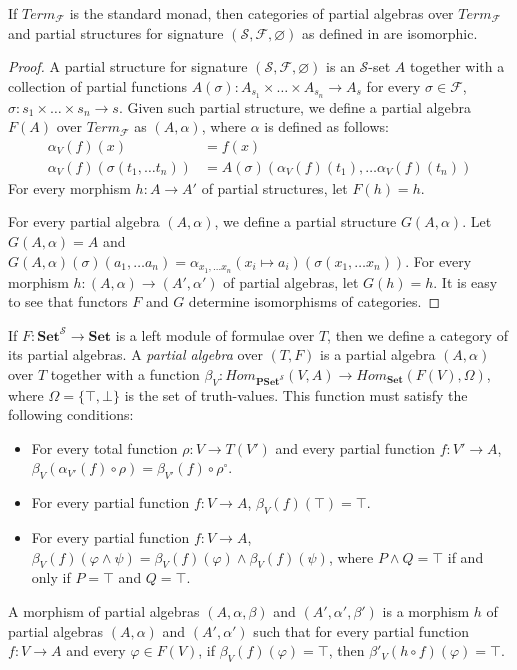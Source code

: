 \documentclass[reqno]{amsart}
\theoremstyle{definition}
\theoremstyle{remark}
\newcommand{\cat}[1]{\mathbf{#1}}
\newcommand{\Set}{\cat{Set}}
\newcommand{\PSet}{\cat{PSet}}
\numberwithin{figure}{section}
\begin{document}
\begin{lem}
If $Term_\mathcal{F}$ is the standard monad, then categories of partial algebras over $Term_\mathcal{F}$
    and partial structures for signature $(\mathcal{S},\mathcal{F},\varnothing)$ as defined in \cite{PHL} are isomorphic.
\end{lem}
\begin{proof}
A partial structure for signature $(\mathcal{S},\mathcal{F},\varnothing)$ is an $\mathcal{S}$-set $A$ together with a collection of partial functions
    $A(\sigma) : A_{s_1} \times \ldots \times A_{s_n} \to A_s$ for every $\sigma \in \mathcal{F}$, $\sigma : s_1 \times \ldots \times s_n \to s$.
Given such partial structure, we define a partial algebra $F(A)$ over $Term_\mathcal{F}$ as $(A,\alpha)$, where $\alpha$ is defined as follows:
\begin{align*}
\alpha_V(f)(x) & = f(x) \\
\alpha_V(f)(\sigma(t_1, \ldots t_n)) & = A(\sigma)(\alpha_V(f)(t_1), \ldots \alpha_V(f)(t_n))
\end{align*}
For every morphism $h : A \to A'$ of partial structures, let $F(h) = h$.

For every partial algebra $(A,\alpha)$, we define a partial structure $G(A,\alpha)$.
Let $G(A,\alpha) = A$ and $G(A,\alpha)(\sigma)(a_1, \ldots a_n) = \alpha_{x_1, \ldots x_n}(x_i \mapsto a_i)(\sigma(x_1, \ldots x_n))$.
For every morphism $h : (A,\alpha) \to (A',\alpha')$ of partial algebras, let $G(h) = h$.
It is easy to see that functors $F$ and $G$ determine isomorphisms of categories.
\end{proof}

If $F : \Set^\mathcal{S} \to \Set$ is a left module of formulae over $T$, then we define a category of its partial algebras.
A \emph{partial algebra} over $(T,F)$ is a partial algebra $(A,\alpha)$ over $T$ together with a function $\beta_V : Hom_{\PSet^\mathcal{S}}(V,A) \to Hom_\Set(F(V),\Omega)$,
    where $\Omega = \{ \top, \bot \}$ is the set of truth-values.
This function must satisfy the following conditions:
\begin{itemize}
\item For every total function $\rho : V \to T(V')$ and every partial function $f : V' \to A$, $\beta_V(\alpha_{V'}(f) \circ \rho) = \beta_{V'}(f) \circ \rho^\circ$.
\item For every partial function $f : V \to A$, $\beta_V(f)(\top) = \top$.
\item For every partial function $f : V \to A$, $\beta_V(f)(\varphi \land \psi) = \beta_V(f)(\varphi) \land \beta_V(f)(\psi)$,
    where $P \land Q = \top$ if and only if $P = \top$ and $Q = \top$.
\end{itemize}
A morphism of partial algebras $(A,\alpha,\beta)$ and $(A',\alpha',\beta')$ is a morphism $h$ of partial algebras $(A,\alpha)$ and $(A',\alpha')$
    such that for every partial function $f : V \to A$ and every $\varphi \in F(V)$, if $\beta_V(f)(\varphi) = \top$, then $\beta'_V(h \circ f)(\varphi) = \top$.
\end{document}
